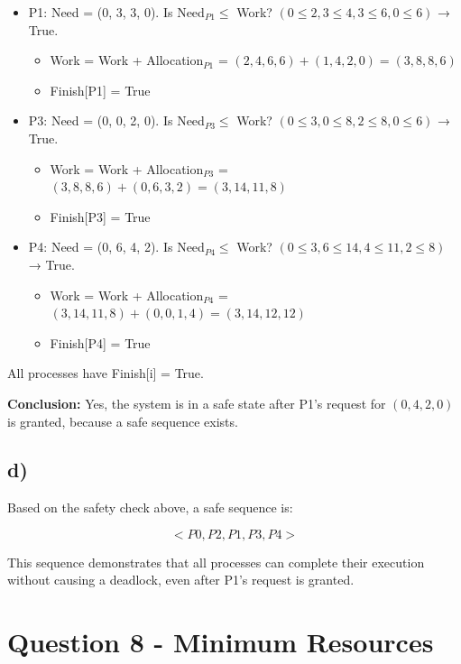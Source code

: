 \documentclass[../main.tex]{subfiles}
\begin{document}
\begin{itemize}
    \item P1: Need = (0, 3, 3, 0). Is Need$_{P1} \le$ Work? $(0\le2, 3\le4, 3\le6, 0\le6)$ → True.
        \begin{itemize}
            \item Work = Work + Allocation$_{P1}$ = $(2,4,6,6) + (1,4,2,0) = (3,8,8,6)$  
            \item Finish[P1] = True
        \end{itemize}
    \item P3: Need = (0, 0, 2, 0). Is Need$_{P3} \le$ Work? $(0\le3, 0\le8, 2\le8, 0\le6)$ → True.
        \begin{itemize}
            \item Work = Work + Allocation$_{P3}$ = $(3,8,8,6) + (0,6,3,2) = (3,14,11,8)$  
            \item Finish[P3] = True
        \end{itemize}
    \item P4: Need = (0, 6, 4, 2). Is Need$_{P4} \le$ Work? $(0\le3, 6\le14, 4\le11, 2\le8)$ → True.
        \begin{itemize}
            \item Work = Work + Allocation$_{P4}$ = $(3,14,11,8) + (0,0,1,4) = (3,14,12,12)$  
            \item Finish[P4] = True
        \end{itemize}
\end{itemize}

All processes have Finish[i] = True.  

\textbf{Conclusion:} Yes, the system is in a safe state after P1's request for $(0,4,2,0)$ is granted, because a safe sequence exists.

\subsection*{d)}

Based on the safety check above, a safe sequence is:

\[
<P0, P2, P1, P3, P4>
\]

This sequence demonstrates that all processes can complete their execution without causing a deadlock, even after P1's request is granted.

\newpage

\section{Question 8 - Minimum Resources}
\end{document}
